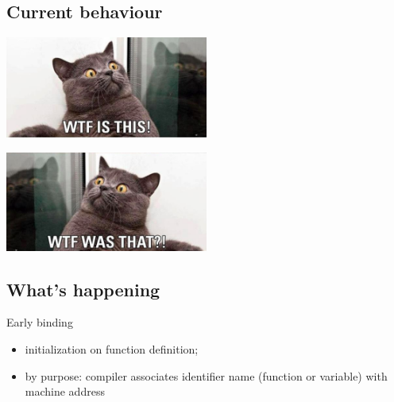 \documentclass{beamer}
\begin{document}
\subsection{Current behaviour}
\begin{frame}
\begin{center}
\structure{\insertsection}
\end{center}

\pause

\end{frame}
\begin{frame}

\pause
\begin{center}
\includegraphics[width=0.5\textwidth]{images/surprised1.png}
\end{center}
\pause

\pause
\begin{center}
\includegraphics[width=0.5\textwidth]{images/surprised2.png}
\end{center}
\end{frame}

\subsection{What's happening}
\begin{frame}
Early binding \\
\begin{itemize}
    \item initialization on function definition;
    \item by purpose: compiler associates identifier name (function or variable) with machine address
\end{itemize}
\end{frame}
\end{document}

